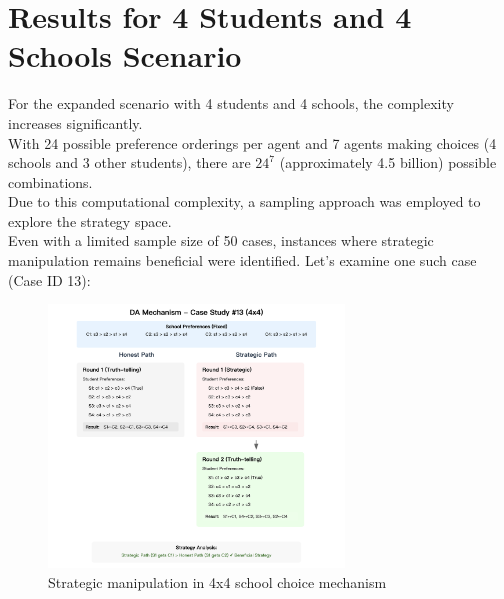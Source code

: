 \documentclass{article}
\begin{document}
\section{Results for 4 Students and 4 Schools Scenario}
For the expanded scenario with 4 students and 4 schools, the complexity increases significantly.\\
With 24 possible preference orderings per agent and 7 agents making choices (4 schools and 3 other students), there are $24^7$ (approximately 4.5 billion) possible combinations.\\
Due to this computational complexity, a sampling approach was employed to explore the strategy space.\\
Even with a limited sample size of 50 cases, instances where strategic manipulation remains beneficial were identified. Let's examine one such case (Case ID 13):
\begin{figure}[h]
\centering
\includegraphics[width=0.7\textwidth]{4*4.png}
\caption{Strategic manipulation in 4x4 school choice mechanism}
\end{figure}
\end{document}
